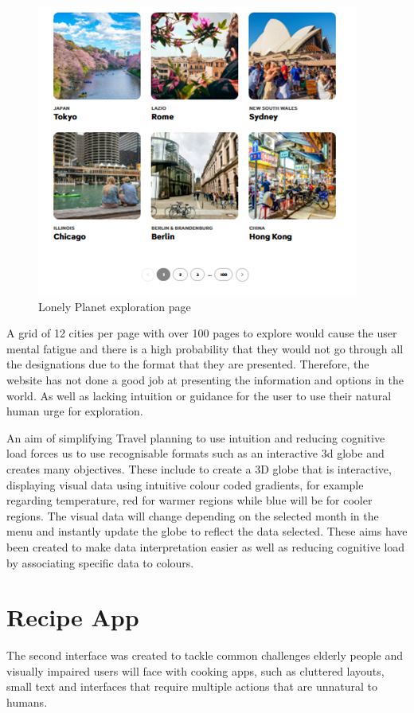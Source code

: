 \documentclass[]{project_interim}
\begin{document}
\begin{figure}[ht!]
  \centering
  \includegraphics{lonleyPlanet.png}
  \vspace*{0.0cm}
  \caption{Lonely Planet exploration page}
  \label{fig:1}
\end{figure}

A grid of 12 cities per page with over 100 pages to explore would cause the user mental fatigue and there is a high probability that they would not go through all the designations due to the format that they are presented. Therefore, the website has not done a good job at presenting the information and options in the world. As well as lacking intuition or guidance for the user to use their natural human urge for exploration.

An aim of simplifying Travel planning to use intuition and reducing cognitive load forces us to use recognisable formats such as an interactive 3d globe and creates many objectives. These include to create a 3D globe that is interactive, displaying visual data using intuitive colour coded gradients, for example regarding temperature, red for warmer regions while blue will be for cooler regions. The visual data will change depending on the selected month in the menu and instantly update the globe to reflect the data selected. These aims have been created to make data interpretation easier as well as reducing cognitive load by associating specific data to colours.

\newpage

\section{Recipe App}
The second interface was created to tackle common challenges elderly people and visually impaired users will face with cooking apps, such as cluttered layouts, small text and interfaces that require multiple actions that are unnatural to humans.
\end{document}
